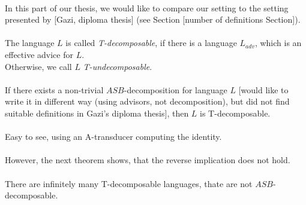\documentclass[12pt,oneside,a4paper]{book}
\begin{document}
\paragraph{}
In this part of our thesis, we would like to compare our setting to the setting presented by [Gazi, diploma thesis] (see Section [number of definitions Section]).

\paragraph{}
\cdefinicia The language $L$ is called \emph{T-decomposable}, if there is a language $L_{adv}$, which is an effective advice for $L$.\\
Otherwise, we call $L$ \emph{T-undecomposable}.


\paragraph{}
\cveta If there exists a non-trivial $ASB$-decomposition for language $L$ \color{red}[would like to write it in different way (using advisors, not decomposition), but did not find suitable definitions in Gazi's diploma thesis]\color{black}, then $L$ is T-decomposable.

\paragraph{}
\dokaz Easy to see, using an A-transducer computing the identity. \square

\paragraph{}
However, the next theorem shows, that the reverse implication does not hold.

\paragraph{}
\cveta There are infinitely many T-decomposable languages, thate are not $ASB$-decomposable.
\end{document}
